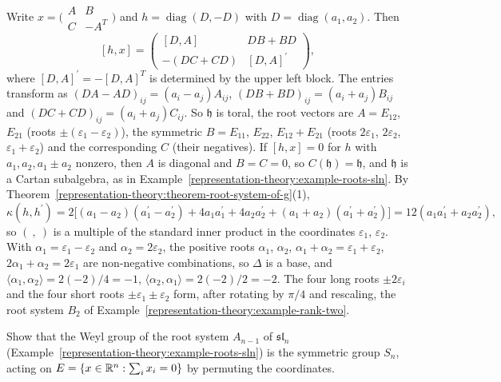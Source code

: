 \begin{solution}
Write $x = \bigl(\begin{smallmatrix}A & B\\ C & -A^T\end{smallmatrix}\bigr)$ and $h = \operatorname{diag}(D, -D)$ with $D = \operatorname{diag}(a_1, a_2)$. Then
\[
[h, x] = \begin{pmatrix}[D, A] & DB + BD\\ -(DC + CD) & [D, A]^{\prime}\end{pmatrix},
\]
where $[D, A]^{\prime} = -[D, A]^T$ is determined by the upper left block. The entries transform as $(DA - AD)_{ij} = (a_i - a_j)A_{ij}$, $(DB + BD)_{ij} = (a_i + a_j)B_{ij}$ and
$(DC + CD)_{ij} = (a_i + a_j)C_{ij}$. So $\mathfrak{h}$ is toral, the root vectors are $A = E_{12}$, $E_{21}$ (roots $\pm(\varepsilon_1 - \varepsilon_2)$), the symmetric $B = E_{11}$,
$E_{22}$, $E_{12} + E_{21}$ (roots $2\varepsilon_1$, $2\varepsilon_2$, $\varepsilon_1 + \varepsilon_2$) and the corresponding $C$ (their negatives). If $[h, x] = 0$ for $h$ with
$a_1, a_2, a_1 \pm a_2$ nonzero, then $A$ is diagonal and $B = C = 0$, so $C(\mathfrak{h}) = \mathfrak{h}$, and $\mathfrak{h}$ is a Cartan subalgebra, as in
Example~\ref{representation-theory:example-roots-sln}. By Theorem~\ref{representation-theory:theorem-root-system-of-g}(1),
\[
\kappa(h, h^{\prime}) = 2\bigl[(a_1 - a_2)(a_1^{\prime} - a_2^{\prime}) + 4a_1a_1^{\prime} + 4a_2a_2^{\prime} + (a_1 + a_2)(a_1^{\prime} + a_2^{\prime})\bigr] = 12(a_1a_1^{\prime} + a_2a_2^{\prime}),
\]
so $(\ ,\ )$ is a multiple of the standard inner product in the coordinates $\varepsilon_1$, $\varepsilon_2$. With $\alpha_1 = \varepsilon_1 - \varepsilon_2$ and $\alpha_2 = 2\varepsilon_2$,
the positive roots $\alpha_1$, $\alpha_2$, $\alpha_1 + \alpha_2 = \varepsilon_1 + \varepsilon_2$, $2\alpha_1 + \alpha_2 = 2\varepsilon_1$ are non-negative combinations, so $\Delta$ is a base, and
$\langle\alpha_1, \alpha_2\rangle = 2(-2)/4 = -1$, $\langle\alpha_2, \alpha_1\rangle = 2(-2)/2 = -2$. The four long roots $\pm2\varepsilon_i$ and the four short roots
$\pm\varepsilon_1 \pm \varepsilon_2$ form, after rotating by $\pi/4$ and rescaling, the root system $B_2$ of Example~\ref{representation-theory:example-rank-two}.
\end{solution}

\begin{exercise}\label{representation-theory:exercise-weyl-group-sln}
Show that the Weyl group of the root system $A_{n-1}$ of $\mathfrak{sl}_n$ (Example~\ref{representation-theory:example-roots-sln}) is the symmetric group $S_n$, acting on
$E = \{x \in \mathbb{R}^n : \sum_ix_i = 0\}$ by permuting the coordinates.
\end{exercise}


